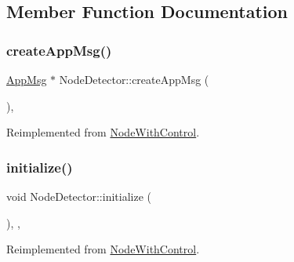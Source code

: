 \subsection{Member Function Documentation}
\mbox{\label{class_node_detector_a7100349647350ad5e3aeb1ed4669c723}} 
\subsubsection{\texorpdfstring{create\+App\+Msg()}{createAppMsg()}}
{\footnotesize\ttfamily \hyperlink{class_app_msg}{App\+Msg} $\ast$ Node\+Detector\+::create\+App\+Msg (\begin{DoxyParamCaption}{ }\end{DoxyParamCaption})\hspace{0.3cm}{\ttfamily [protected]}, {\ttfamily [virtual]}}



Reimplemented from \hyperlink{class_node_with_control_a7772568c2836f5f204952ebe659e0049}{Node\+With\+Control}.

\mbox{\label{class_node_detector_aefa188ab0657837b1b57f24674d3ef22}} 
\subsubsection{\texorpdfstring{initialize()}{initialize()}}
{\footnotesize\ttfamily void Node\+Detector\+::initialize (\begin{DoxyParamCaption}{ }\end{DoxyParamCaption})\hspace{0.3cm}{\ttfamily [override]}, {\ttfamily [protected]}, {\ttfamily [virtual]}}



Reimplemented from \hyperlink{class_node_with_control_a08c8e80fd67b52c51c642d7c66fe729c}{Node\+With\+Control}.

\mbox{\label{class_node_detector_a17ecf9939fce7471f4513b66185743cc}} 
